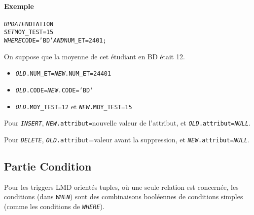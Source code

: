 \documentclass[10pt]{article}
\begin{document}
                \paragraph{Exemple}
                    \begin{alltt}
                        \begin{tabbing}
\emph{UPDATE}\=NOTATION\\
\emph{SET}\>MOY_TEST=15\\
\emph{WHERE}\>CODE='BD' \emph{AND} NUM_ET=2401;
                        \end{tabbing}
                    \end{alltt}

                On suppose que la moyenne de cet étudiant en BD était 12.
                \begin{itemize}
                    \item \emph{\texttt{OLD}}\texttt{.NUM\_ET=}\emph{\texttt{NEW}}\texttt{.NUM\_ET=24401}
                    \item \emph{\texttt{OLD}}\texttt{.CODE=}\emph{\texttt{NEW}}\texttt{.CODE='BD'}
                    \item \emph{\texttt{OLD}}\texttt{.MOY\_TEST=12} et \emph{\texttt{NEW}}\texttt{.MOY\_TEST=15}
                \end{itemize}

                Pour \emph{\texttt{INSERT}}, \emph{\texttt{NEW}}\texttt{.attribut=}nouvelle valeur de l'attribut, et \emph{\texttt{OLD}}\texttt{.attribut=}\emph{\texttt{NULL}}.

                Pour \emph{\texttt{DELETE}}, \emph{\texttt{OLD}}\texttt{.attribut}=valeur avant la suppression, et \emph{\texttt{NEW}}\texttt{.attribut=}\emph{\texttt{NULL}}.

            \subsection{Partie Condition}
                Pour les triggers LMD orientés tuples, où une seule relation est concernée, les conditions (dans \emph{\texttt{WHEN}}) sont des combinaisons booléennes de conditions simples (comme les conditions de \emph{\texttt{WHERE}}).
\end{document}
